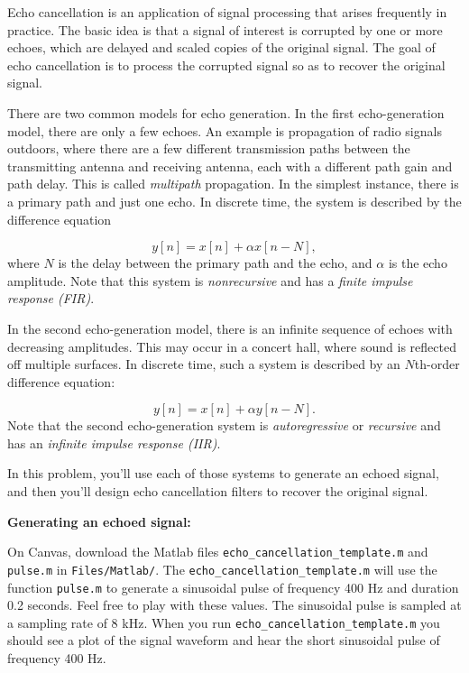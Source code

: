 \documentclass[12pt]{report}
\begin{document}

Echo cancellation is an application of signal processing that arises frequently in practice. The basic idea is that a signal of interest is corrupted by one or more echoes, which are delayed and scaled copies of the original signal. The goal of echo cancellation is to process the corrupted signal so as to recover the original signal.

There are two common models for echo generation. In the first echo-generation model, there are only a few echoes. An example is propagation of radio signals outdoors, where there are a few different transmission paths between the transmitting antenna and receiving antenna, each with a different path gain and path delay. This is called \textit{multipath} propagation. In the simplest instance, there is a primary path and just one echo. In discrete time, the system is described by the difference equation

\begin{equation}
y[n] = x[n] + \alpha x[n-N],
\end{equation}
where $N$ is the delay between the primary path and the echo, and $\alpha$ is the echo amplitude. Note that this system is \textit{nonrecursive} and has a \textit{finite impulse response (FIR)}.

In the second echo-generation model, there is an infinite sequence of echoes with decreasing amplitudes. This may occur in a concert hall, where sound is reflected off multiple surfaces. In discrete time, such a system is described by an $N$th-order difference equation:

\begin{equation}
y[n] = x[n] + \alpha y[n-N].
\end{equation}                                                           
Note that the second echo-generation system is \textit{autoregressive} or \textit{recursive} and has an \textit{infinite impulse response (IIR)}.

In this problem, you'll use each of those systems to generate an echoed signal, and then you'll design echo cancellation filters to recover the original signal. 

\noindent
\textbf{Generating an echoed signal:}

On Canvas, download the Matlab files \texttt{echo\_cancellation\_template.m} and \texttt{pulse.m} in \texttt{Files/Matlab/}. The \texttt{echo\_cancellation\_template.m} will use the function \texttt{pulse.m} to generate a sinusoidal pulse of frequency 400 Hz and duration 0.2 seconds. Feel free to play with these values. The sinusoidal pulse is sampled at a sampling rate of 8 kHz. When you run \texttt{echo\_cancellation\_template.m} you should see a plot of the signal waveform and hear the short sinusoidal pulse of frequency 400 Hz.
\end{document}
